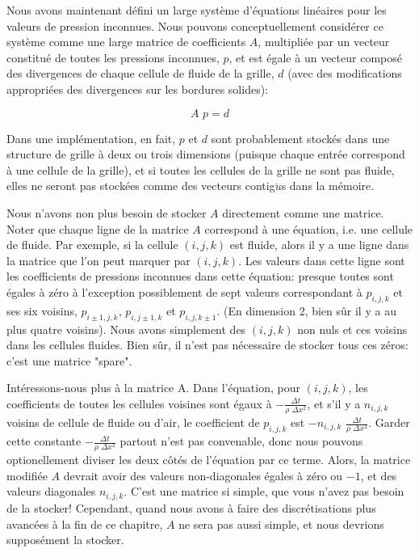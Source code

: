 \documentclass[11pt]{report}
\begin{document}
Nous avons maintenant défini un large système d'équations linéaires pour les valeurs de pression inconnues. Nous pouvons conceptuellement considérer ce système comme une large matrice de coefficients $A$, multipliée par un vecteur constitué de toutes les pressions inconnues, $p$, et est égale à un vecteur composé des divergences de chaque cellule de fluide de la grille, $d$ (avec des modifications appropriées des divergences sur les bordures solides):

\begin{equation}
A\,\, p = d
\end{equation} 

Dans une implémentation, en fait, $p$ et $d$ sont probablement stockés dans une structure de grille à deux ou trois dimensions (puisque chaque entrée correspond à une cellule de la grille), et si toutes les cellules de la grille ne sont pas fluide, elles ne seront pas stockées comme des vecteurs contig$\ddot{u}$s dans la mémoire.

Nous n'avons non plus besoin de stocker $A$ directement comme une matrice. Noter que chaque ligne de la matrice $A$ correspond à une équation, i.e. une cellule de fluide. Par exemple, si la cellule $(i,j,k)$ est fluide, alors il y a une ligne dans la matrice que l'on peut marquer par $(i,j,k)$. Les valeurs dans cette ligne sont les coefficients de pressions inconnues dans cette équation: presque toutes sont égales à zéro à l'exception possiblement de sept valeurs correspondant à $p_{i,j,k}$ et ses six voisins, $p_{i\pm 1,j,k}$, $p_{i,j\pm 1,k}$ et $p_{i,j,k\pm 1}$. (En dimension 2, bien sûr il y a au plus quatre voisins). Nous avons simplement des $(i,j,k)$ non nuls et ces voisins dans les cellules fluides. Bien sûr, il n'est pas nécessaire de stocker tous ces zéros: c'est une matrice "spare".\newline

Intéressons-nous plus à la matrice A. Dans l'équation, pour $(i,j,k)$, les coefficients de toutes les cellules voisines sont égaux à $-\frac{\Delta t}{\rho \,\, \Delta x^2}$, et s'il y a $n_{i,j,k}$ voisins de cellule de fluide ou d'air, le coefficient de $p_{i,j,k}$ est $-n_{i,j,k}\,\,\frac{\Delta t}{\rho \,\, \Delta x^2}$. Garder cette constante $-\frac{\Delta t}{\rho \,\, \Delta x^2}$ partout n'est pas convenable, donc nous pouvons optionellement diviser les deux côtés de l'équation par ce terme. Alors, la matrice modifiée $A$ devrait avoir des valeurs non-diagonales égales à zéro ou $-1$, et des valeurs diagonales $n_{i,j,k}$. C'est une matrice si simple, que vous n'avez pas besoin de la stocker! Cependant, quand nous avons à faire des discrétisations plus avancées à la fin de ce chapitre, $A$ ne sera pas aussi simple, et nous devrions supposément la stocker. \newline
\end{document}
